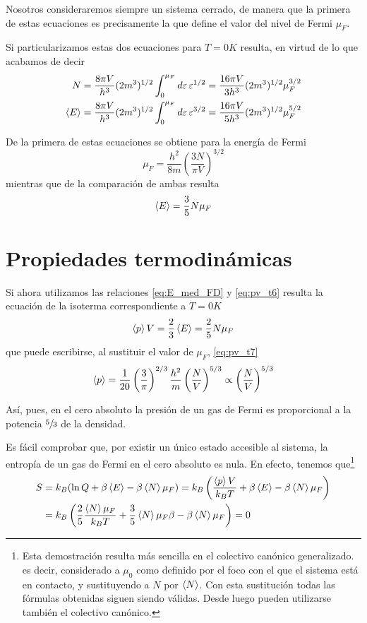 Nosotros consideraremos siempre un sistema cerrado, de manera que la primera de estas ecuaciones es precisamente la que define el valor del nivel de Fermi $\mu_F$.

Si particularizamos estas dos ecuaciones para $T = 0 K$ resulta, en virtud de lo que acabamos de decir
\begin{align}
	N &= \frac{8\pi V}{h^3} (2m^3)^{1/2} \int_{0}^{\mu_F} \dd{\varepsilon} \varepsilon^{1/2} = \frac{16\pi V}{3h^3} (2m^3)^{1/2} \mu_F^{3/2}\\
	\expval{E} &=  \frac{8\pi V}{h^3} (2m^3)^{1/2} \int_{0}^{\mu_F} \dd{\varepsilon} \varepsilon^{3/2} = \frac{16\pi V}{5h^3} (2m^3)^{1/2} \mu_F^{5/2}
\end{align}

De la primera de estas ecuaciones se obtiene para la energía de Fermi
\begin{equation}
	\mu_F = \frac{h^2}{8m} \left( \frac{3N}{\pi V}\right)^{3/2}
\end{equation}
mientras que de la comparación de ambas resulta
\begin{equation}\label{eq:E_med_FD}
	\expval{E} = \frac{3}{5} N \mu_F
\end{equation}

\section{Propiedades termodinámicas}

Si ahora utilizamos las relaciones \eqref{eq:E_med_FD} y \eqref{eq:pv_t6} resulta la ecuación de la isoterma correspondiente a $T=0K$
\begin{equation}\label{eq:pv_t7}
	\expval{p}V = \frac{2}{3}\expval{E} = \frac{2}{5} N \mu_F
\end{equation}
que puede escribirse, al sustituir el valor de $\mu_F$, \eqref{eq:pv_t7}
\begin{equation}\label{eq:pv_t7}
	\expval{p} = \frac{1}{20} \left( \frac{3}{\pi} \right)^{2/3} \frac{h^2}{m} \left( \frac{N}{V} \right)^{5/3} \propto \left( \frac{N}{V} \right)^{5/3} 
\end{equation}

Así, pues, en el cero absoluto la presión de un gas de Fermi es proporcional a la potencia $\sfrac{5}{3}$ de la densidad.

Es fácil comprobar que, por existir un único estado accesible al sistema, la entropía de un gas de Fermi en el cero absoluto es nula.
En efecto, tenemos que\footnote{Esta demostración resulta más sencilla en el colectivo canónico generalizado. es decir, considerado a $\mu_0$ como definido por el foco con el que el sistema está en contacto, y sustituyendo a $N$ por $\expval{N}$. Con esta sustitución todas las fórmulas obtenidas siguen siendo válidas.
Desde luego pueden utilizarse también el colectivo canónico.}
\begin{align}
	S &= k_B(\ln Q + \beta \expval{E} - \beta \expval{N} \mu_F)= k_B \left( \frac{\expval{p}V}{k_B T} + \beta \expval{E} - \beta \expval{N} \mu_F \right) \nonumber \\
	  &= k_B \left( \frac{2}{5} \frac{\expval{N}\mu_F}{k_B T} + \frac{3}{5}\expval{N}\mu_F \beta - \beta \expval{N} \mu_F \right) = 0
\end{align}

